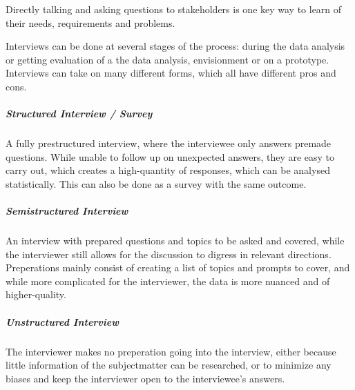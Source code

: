 \begin{method}[Interview] \label{meth:interview} 
  Directly talking and asking questions to stakeholders is one key way to learn
  of their needs, requirements and problems. 
  
  Interviews can be done at several stages of the process: during the data
  analysis or getting evaluation of a the data analysis, envisionment or on a
  prototype. Interviews can take on many different forms, which all have different pros and
  cons.
  \cite[p. 142-146]{benyon_14}
\end{method}

\subparagraph{Structured Interview / Survey}  
A fully prestructured interview, where the interviewee only answers premade
questions. While unable to follow up on unexpected answers, they are easy to
carry out, which creates a high-quantity of responses, which can be analysed
statistically. This can also be done as a survey with the same outcome. 
\cite[p. 142]{benyon_14}

\subparagraph{Semistructured Interview} 
An interview with prepared questions and topics to be asked and covered, while
the interviewer still allows for the discussion to digress in relevant
directions. Preperations mainly consist of creating a list of topics and prompts
to cover, and while more complicated for the interviewer, the data is more
nuanced and of higher-quality.
\cite[p. 143]{benyon_14}

\subparagraph{Unstructured Interview} 
The interviewer makes no preperation going into the interview, either because
little information of the subjectmatter can be researched, or to minimize any
biases and keep the interviewer open to the interviewee's answers.
\cite[p. 143]{benyon_14}
